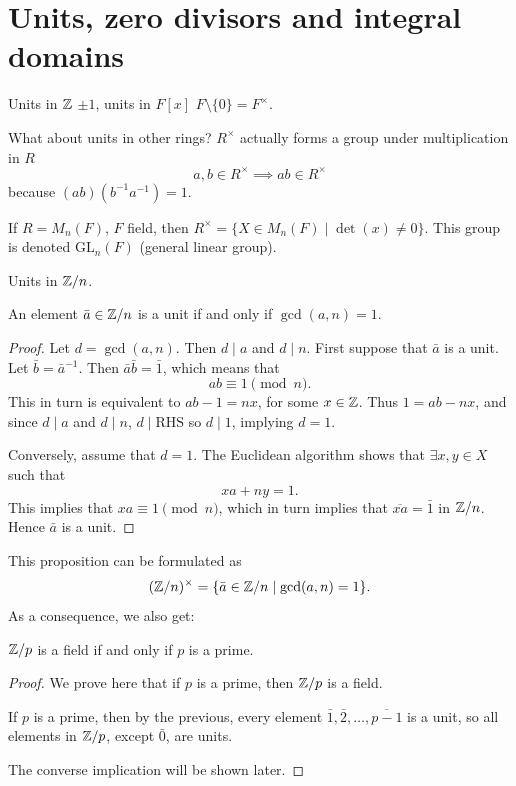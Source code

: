 \documentclass[10pt, a4paper]{article}
\begin{document}
\newpage

\section{Units,
zero divisors and integral domains}
Units in $\mathbb{Z}$ $\pm 1$,
units in $F[x]$ $F \setminus \{0\} = F ^ {\times}$.

What about units in other rings?
$R ^ {\times}$ actually forms a group under multiplication in $R$
\[
a, b \in R ^ {\times} \implies ab \in R ^ {\times}
\]
because $(ab)(b ^ {-1}a ^ {-1}) = 1$.

\begin{example}
    If $R = M_n(F)$,
    $F$ field,
    then $R ^ {\times} = \{X \in M_n(F) \mid \det(x) \neq 0\}$.
    This group is denoted $\mathrm{GL}_n(F)$
    (general linear group).
\end{example}

Units in $\mathbb{Z} / n$.
\begin{proposition}
    An element $\bar{a} \in \mathbb{Z} / n$ is a unit if and only if $\gcd(a, n) = 1$.

    \begin{proof}
        Let $d = \gcd(a, n)$.
        Then $d \mid a$ and $d \mid n$.
        First suppose that $\bar{a}$ is a unit.
        Let $\bar{b} = \bar{a} ^ {-1}$.
        Then $\bar{a}\bar{b} = \bar{1}$,
        which means that
        \[
        ab \equiv 1 \pmod{n}.
        \]
        This in turn is equivalent to $ab - 1 = nx$,
        for some $x \in \mathbb{Z}$.
        Thus $1 = ab - nx$,
        and since $d \mid a$ and $d \mid n$,
        $d \mid \text{RHS}$ so $d \mid 1$,
        implying $d = 1$.

        Conversely,
        assume that $d = 1$.
        The Euclidean algorithm shows that $\exists x, y \in X$ such that
        \[
        xa + ny = 1.
        \]
        This implies that $xa \equiv 1 \pmod{n}$,
        which in turn implies that $\overline{xa} = \bar{1}$ in $\mathbb{Z} / n$.
        Hence $\bar{a}$ is a unit.
    \end{proof}
\end{proposition}
This proposition can be formulated as
\[
(\mathbb{Z} / n) ^ {\times} = \{\bar{a} \in \mathbb{Z} / n \mid \gcd(a, n) = 1\}.
\]
As a consequence,
we also get:

\begin{corollary}
    $\mathbb{Z} / p$ is a field if and only if $p$ is a prime.

    \begin{proof}
        We prove here that if $p$ is a prime,
        then $\mathbb{Z} / p$ is a field.

        If $p$ is a prime,
        then by the previous,
        every element $\bar{1}, \bar{2}, \dotsc, \overline{p - 1}$ is a unit,
        so all elements in $\mathbb{Z} / p$,
        except $\bar{0}$,
        are units.

        The converse implication will be shown later.
    \end{proof}
\end{corollary}
\end{document}
